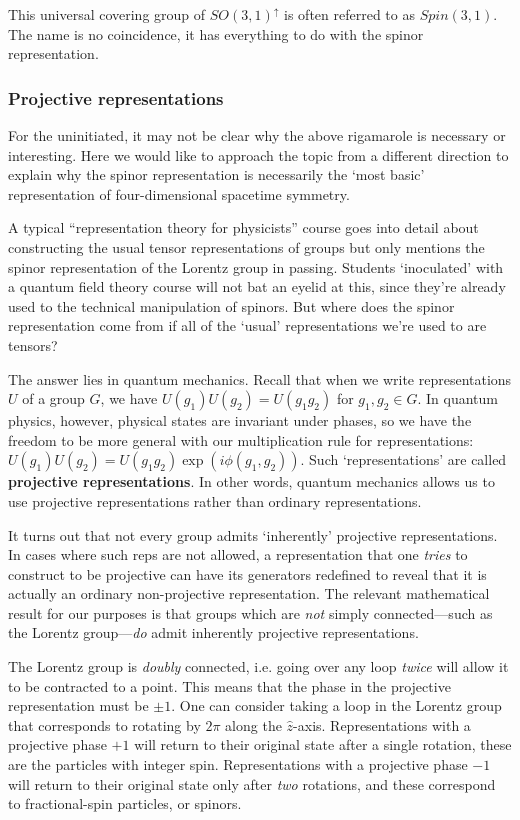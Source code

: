 \documentclass[12pt, oneside]{report}    %
\begin{document}
This universal covering group of $SO(3,1)^\uparrow$ is often referred to as $Spin(3,1)$. The name is no coincidence, it has everything to do with the spinor representation.


\subsubsection{Projective representations}\label{sec:SUSYalg:projective}

For the uninitiated, it may not be clear why the above rigamarole is necessary or  interesting. Here we would like to approach the topic from a different direction to explain why the spinor representation is necessarily the `most basic' representation of four-dimensional spacetime symmetry.
    
A typical ``representation theory for physicists'' course goes into detail about constructing the usual tensor representations of groups but only mentions the spinor representation of the Lorentz group in passing. Students `inoculated' with a quantum field theory course will not bat an eyelid at this, since they're already used to the technical manipulation of spinors. But where does the spinor representation come from if all of the `usual' representations we're used to are tensors?
    
 The answer lies in quantum mechanics. Recall that when we write representations $U$ of a group $G$, we have $U(g_1)U(g_2) = U(g_1g_2)$ for $g_1, g_2 \in G$. In quantum physics, however, physical states are invariant under phases, so we have the freedom to be more general with our multiplication rule for representations: $U(g_1)U(g_2) = U(g_1g_2)\exp({i\phi(g_1,g_2)})$. Such `representations' are called \textbf{projective representations}. In other words, quantum mechanics allows us to use projective representations rather than ordinary representations. 
    
It turns out that not every group admits `inherently' projective representations. In cases where such reps are not allowed, a representation that one \textit{tries} to construct to be projective can have its generators redefined to reveal that it is actually an ordinary non-projective representation. The relevant mathematical result for our purposes is that groups which are \textit{not} simply connected---such as the Lorentz group---\textit{do} admit inherently projective representations. 
    
The Lorentz group is \textit{doubly} connected, i.e. going over any loop \textit{twice} will allow it to be contracted to a point. This means that the phase in the projective representation must be $\pm 1$. One can consider taking a loop in the Lorentz group that corresponds to rotating by $2\pi$ along the $\hat z$-axis. Representations with a projective phase $+1$ will return to their original state after a single rotation, these are the particles with integer spin. Representations with a projective phase $-1$ will return to their original state only after \textit{two} rotations, and these correspond to fractional-spin particles, or spinors. 
    
\end{document}
